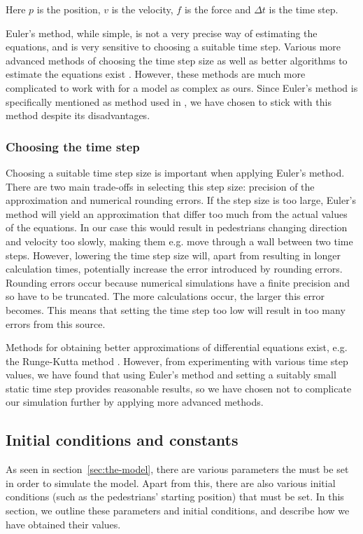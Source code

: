 
Here $p$ is the position, $v$ is the velocity, $f$ is the force and $\Delta t$ 
is the time step.

Euler's method, while simple, is not a very precise way of estimating the 
equations, and is very sensitive to choosing a suitable time step. Various 
more advanced methods of choosing the time step size as well as better 
algorithms to estimate the equations exist \cite{MD}. However, these methods 
are much more complicated to work with for a model as complex as ours. Since 
Euler's method is specifically mentioned as method used in \cite{ABconstant}, 
we have chosen to stick with this method despite its disadvantages.

\subsubsection{Choosing the time step}
\label{sec:choosing-timestep}
Choosing a suitable time step size is important when applying Euler's method.  
There are two main trade-offs in selecting this step size: precision of the 
approximation and numerical rounding errors. If the step size is too large, 
Euler's method will yield an approximation that differ too much from the 
actual values of the equations. In our case this would result in pedestrians 
changing direction and velocity too slowly, making them e.g. move through a 
wall between two time steps. However, lowering the time step size will, apart 
from resulting in longer calculation times, potentially increase the error 
introduced by rounding errors. Rounding errors occur because numerical 
simulations have a finite precision and so have to be truncated. The more 
calculations occur, the larger this error becomes. This means that setting the 
time step too low will result in too many errors from this source.

Methods for obtaining better approximations of differential equations exist, 
e.g. the Runge-Kutta method \cite{butcher2003}. However, from experimenting 
with various time step values, we have found that using Euler's method and 
setting a suitably small static time step provides reasonable results, so we 
have chosen not to complicate our simulation further by applying more advanced 
methods.

\subsection{Initial conditions and constants}
\label{sec:init-cond}
As seen in section~\ref{sec:the-model}, there are various parameters the must 
be set in order to simulate the model. Apart from this, there are also various 
initial conditions (such as the pedestrians' starting position) that must be 
set. In this section, we outline these parameters and initial conditions, and 
describe how we have obtained their values.

